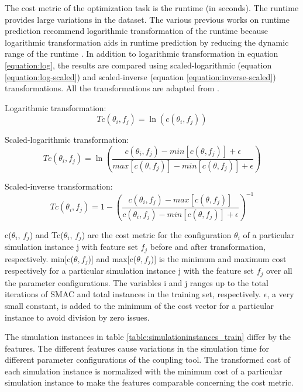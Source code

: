 The cost metric of the optimization task is the runtime (in seconds). The runtime provides large variations in the dataset. The various previous works on runtime prediction recommend logarithmic transformation of the runtime because logarithmic transformation aids in runtime prediction by reducing the dynamic range of the runtime \cite{SMAC_mainpaper} \cite{SMAC_extendedpaper}. In addition to logarithmic transformation in equation \ref{equation:log}, the results are compared using scaled-logarithmic (equation \ref{equation:log-scaled}) and scaled-inverse (equation \ref{equation:inverse-scaled}) transformations. All the transformations are adapted from \cite{smac-github}.

Logarithmic transformation:
\begin{equation}
    Tc(\theta_{i}, f_j) = \ln\left(c(\theta_{i}, f_j)\right)
    \label{equation:log}
\end{equation}

Scaled-logarithmic transformation:
\begin{equation}
    Tc(\theta_{i}, f_j) = \ln \left(\frac{c(\theta_{i}, f_j)-min[c(\theta, f_j)]+\epsilon }{max[c(\theta, f_j)]-min[c(\theta, f_j)] +\epsilon}\right)
    \label{equation:log-scaled}
\end{equation}

Scaled-inverse transformation:
\begin{equation}
    Tc(\theta_{i}, f_j) =1- \left( \frac{c(\theta_{i}, f_j)-max[c(\theta, f_j)]}{c(\theta_{i}, f_j)-min[c(\theta, f_j)] +\epsilon}\right)^{-1}
    \label{equation:inverse-scaled}
\end{equation}

c($\theta_{i}$, $f_j$) and Tc($\theta_{i}$, $f_j$) are the cost metric for the configuration $\theta_i$ of a particular simulation instance j with feature set $f_j$ before and after transformation, respectively.  min[c($\theta, f_j$)] and max[c($\theta, f_j$)] is the minimum and maximum cost respectively for a particular simulation instance j with the feature set $f_j$ over all the parameter configurations. The variables i and j ranges up to the total iterations of SMAC and total instances in the training set, respectively. $\epsilon$, a very small constant, is added to the minimum of the cost vector for a particular instance to avoid division by zero issues.

The simulation instances in table \ref{table:simulationinstances_train} differ by the features. The different features cause variations in the simulation time for different parameter configurations of the coupling tool. The transformed cost of each simulation instance is normalized with the minimum cost of a particular simulation instance to make the features comparable concerning the cost metric.

